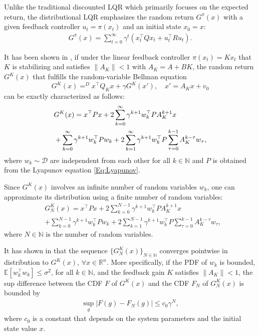 \documentclass[letterpaper, 10 pt, conference]{ieeeconf}  %
\begin{document}
Unlike the traditional discounted LQR which primarily focuses on the expected return, the distributional LQR emphasizes the random return $G^\pi(x)$ with a given feedback controller $u_t = \pi(x_t)$ and an initial state $x_0 = x$:
\begin{align}
    G^\pi(x) = \sum_{t=0}^{\infty} \gamma^t \left( x_t^\top Q x_t + u_t^\top R u_t \right).   
\end{align}
    


  
It has been shown in \cite{wang2023policy}, if under the linear feedback controller $\pi(x_t)=Kx_t$ that $K$ is stabilizing and satisfies $\|A_{K} \|<1$ with $A_K=A+BK$, the random return $G^{K}(x)$ that fulfills the random-variable Bellman equation 
$$G^{K}(x) \mathop{=}^{D} x^{\top}Q_Kx + \gamma G^{K}(x'),\quad x'=A_K x+ v_0$$
can be exactly characterized as follows:
\begin{align}\label{Eq:Gkx}
      &G^K(x) = x^\top P x + 2 \sum_{k=0}^{\infty} \gamma^{k+1} w_k^\top P A_K^{k+1} x \\  \notag
&+ 
\sum_{k=0}^{\infty} \gamma^{k+1} w_k^\top P w_k + 2 \sum_{k=1}^{\infty} \gamma^{k+1} w_k^\top P \sum_{\tau=0}^{k-1} A_K^{k-\tau} w_\tau, 
\end{align}
where $w_k \sim \mathcal{D} $ are independent from each other for all $k\in\mathbb{N}$ and $P$ is obtained from the Lyapunov equation \eqref{Eq:Lyapunov}. 

Since  $G^K(x)$ involves an infinite number of random variables $w_k$, one can approximate its distribution using a finite number of random variables:  
\begin{align}\label{eq:approxreturn}
    &{G}^{K}_N(x) =  x^{\top} P x  +  2 \sum_{k = 0 }^{N-1} \gamma^{k+1} w_k^{\top} P A_K^{k+1}x \nonumber \\
    &+  \sum_{k = 0 }^{N-1}  \gamma^{k+1}  w_k^{\top} P w_k + 
 2 \sum_{k = 1 }^{N-1} \gamma^{k+1} w_k^{\top} P \sum_{\tau=0}^{k-1} A_K^{k-\tau}w_{\tau},
\end{align}
where $N\in \mathbb{N}$ is the number of random variables.

It has shown in \cite{wang2023policy} that the sequence $\{{G}^{K}_N(x)\}_{N\in \mathbb{N}}$ converges pointwise in distribution to $G^{K}(x)$,  $\forall x\in\mathbb{R}^n$.  More specifically, if the PDF of $w_k$ is bounded,  $\mathbb{E}[w_k^{\top} w_k] \leq \sigma^2$, for all $k\in \mathbb{N}$, and the feedback gain  $K$ satisfies $\left\|A_K\right\| <1$, the sup difference between the CDF $F$ of ${G}^{K}(x)$ and the CDF ${F}_N$ of ${G}_N^{K}(x)$ is bounded by
\begin{align}\label{eq:approximat:bound}
     \sup_{g}|{F}(g)-{F}_N(g) | \leq c_0 \gamma^N, 
\end{align}
where $c_0$ is a constant that depends on the system parameters and the initial state value $x$. 
\end{document}
